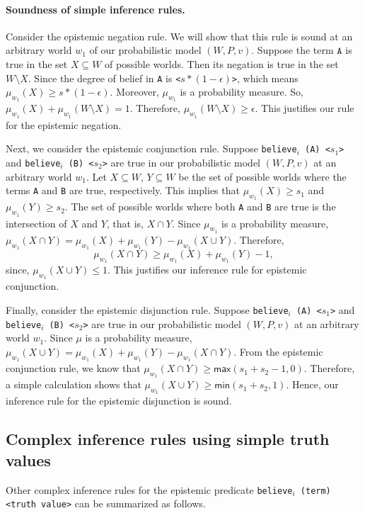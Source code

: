 \documentclass[12pt]{article}
\begin{document}
\paragraph{Soundness of simple inference rules.} Consider the epistemic negation rule. We will show that this rule is sound at an arbitrary world $w_1$ of our probabilistic model $(W,P,v)$.  Suppose the term $\texttt{A}$ is true in the set $X\subseteq W$ of possible worlds. Then its negation is true in the set $W\setminus X$. Since the degree of belief in \texttt{A} is \texttt{<$s*(1-\epsilon)$>}, which means $\mu_{w_1}(X) \geq s*(1-\epsilon)$. Moreover, $\mu_{w_1}$ is a probability measure. So, $\mu_{w_1}(X) +\mu_{w_1} (W\setminus X) = 1$. Therefore, $\mu_{w_1} (W\setminus X)\geq \epsilon$.  This justifies our rule for the epistemic negation. 



Next, we consider the epistemic conjunction rule. Suppose \texttt{believe$_i$ (A) <$s_1$>} and \texttt{believe$_i$ (B) <$s_2$>} are true in our probabilistic model $(W,P,v)$ at an arbitrary world $w_1$. Let $X\subseteq W$, $Y\subseteq W$ be the set of possible worlds where the terms \texttt{A} and \texttt{B} are true, respectively. This implies that $\mu_{w_1} (X) \geq s_1$ and $\mu_{w_1} (Y) \geq s_2$. The set of possible worlds where both \texttt{A} and \texttt{B} are true is the intersection of $X$ and $Y$, that is, $X\cap Y$. Since $\mu_{w_1}$ is a probability measure, $\mu_{w_1} (X\cap Y) =\mu_{w_1}(X) + \mu_{w_1}(Y) -\mu_{w_1}(X\cup Y)$. Therefore, $$\mu_{w_1} (X\cap Y)\geq \mu_{w_1}(X) + \mu_{w_1}(Y)-1,$$ 
since, $\mu_{w_1}(X\cup Y)\leq 1.$ This justifies our inference rule for epistemic conjunction.


Finally, consider the epistemic disjunction rule. %
Suppose \texttt{believe$_i$ (A) <$s_1$>} and \texttt{believe$_i$ (B) <$s_2$>} are true in our probabilistic model $(W,P,v)$ at an arbitrary world $w_1$. Since $\mu$ is a probability measure,  $\mu_{w_1} (X\cup Y) =\mu_{w_1}(X) + \mu_{w_1}(Y) -\mu_{w_1}(X\cap Y)$. From the epistemic conjunction rule, we know that $\mu_{w_1}(X\cap Y)\geq \mathsf{max}(s_1+s_2 -1,0)$. Therefore, a simple calculation shows that $\mu_{w_1} (X\cup Y) \geq \mathsf{min}(s_1+s_2,1)$. Hence, our inference rule for the epistemic disjunction is sound. 


\subsection{Complex inference rules using simple truth values} 
Other complex inference rules for the epistemic predicate  \texttt{believe$_i$ (term) <truth value>} can be summarized as follows.
\end{document}
